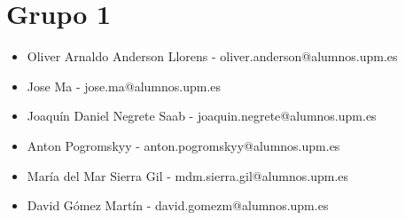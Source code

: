 \vspace{3\baselineskip}
\section*{Grupo 1}
\begin{itemize}
  \item Oliver Arnaldo Anderson Llorens - oliver.anderson@alumnos.upm.es
  \item Jose Ma - jose.ma@alumnos.upm.es
  \item Joaquín Daniel Negrete Saab - joaquin.negrete@alumnos.upm.es
  \item Anton Pogromskyy - anton.pogromskyy@alumnos.upm.es
  \item María del Mar Sierra Gil - mdm.sierra.gil@alumnos.upm.es
  \item David Gómez Martín - david.gomezm@alumnos.upm.es
\end{itemize}
\newpage